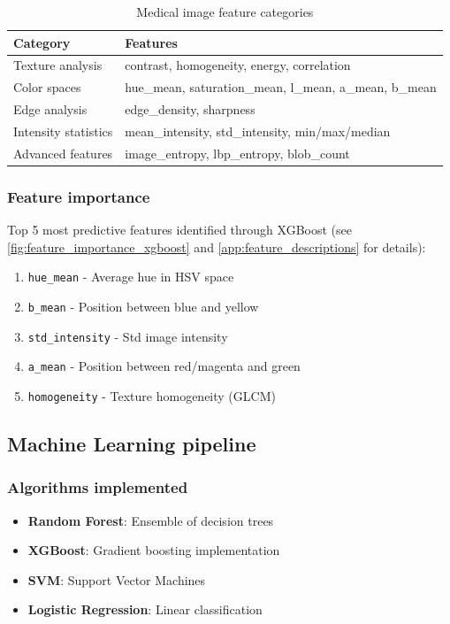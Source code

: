 \documentclass[11pt]{article}
\begin{document}
\begin{table}[H]
\centering
\caption{Medical image feature categories}
\begin{tabular}{ll}
\toprule
\textbf{Category} & \textbf{Features} \\
\midrule
Texture analysis & contrast, homogeneity, energy, correlation \\
Color spaces & hue\_mean, saturation\_mean, l\_mean, a\_mean, b\_mean \\
Edge analysis & edge\_density, sharpness \\
Intensity statistics & mean\_intensity, std\_intensity, min/max/median \\
Advanced features & image\_entropy, lbp\_entropy, blob\_count \\
\bottomrule
\end{tabular}
\end{table}

\subsubsection{Feature importance}
Top 5 most predictive features identified through XGBoost (see \ref{fig:feature_importance_xgboost} and \ref{app:feature_descriptions} for details):
\begin{enumerate}
    \item \texttt{hue\_mean} - Average hue in HSV space
    \item \texttt{b\_mean} - Position between blue and yellow
    \item \texttt{std\_intensity} - Std image intensity
    \item \texttt{a\_mean} - Position between red/magenta and green 
    \item \texttt{homogeneity} - Texture homogeneity (GLCM)
\end{enumerate}

\subsection{Machine Learning pipeline}

\subsubsection{Algorithms implemented}
\begin{itemize}
    \item \textbf{Random Forest}: Ensemble of decision trees
    \item \textbf{XGBoost}: Gradient boosting implementation
    \item \textbf{SVM}: Support Vector Machines
    \item \textbf{Logistic Regression}: Linear classification
\end{itemize}
\end{document}
